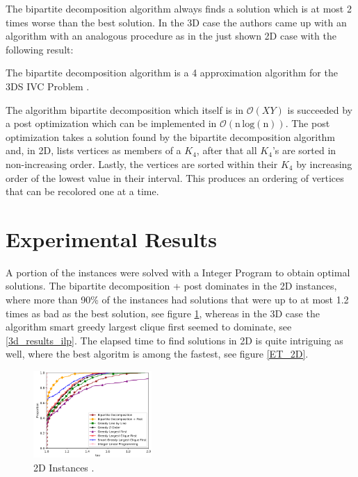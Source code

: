 \documentclass[sigconf]{acmart}
\begin{document}
  The bipartite decomposition algorithm always finds a solution which is at most 2 times worse
  than the best solution. In the 3D case the authors came up with an algorithm with an analogous procedure
  as in the just shown 2D case with the following result:
  
  \begin{theorem}
    The bipartite decomposition algorithm is a 4 approximation algorithm for the 3DS IVC Problem \cite{main_paper}.
  \end{theorem}
  
  The algorithm bipartite decomposition which itself is in $\mathcal{O}(XY)$ is succeeded by a post optimization
  which can be implemented in $\mathcal{O}(\mathrm{n \,log(n)})$. The post optimization takes a solution found by the
  bipartite decomposition algorithm and, in 2D, lists vertices as
  members of a $K_4$, after that all $K_4$'s are sorted in non-increasing order. Lastly,
  the vertices are sorted within their $K_4$ by increasing order of the lowest value in 
  their interval. This produces an ordering of vertices that can be recolored one at a time.


\section{Experimental Results}

A portion of the instances were solved with a Integer Program to obtain optimal solutions. The bipartite 
decomposition + post dominates in the 2D instances, where more than 90\% of the instances had solutions
that were up to at most 1.2 times as bad as the best solution, see figure \ref{2d_results_ilp}, whereas in
the 3D case the algorithm smart greedy largest clique first seemed to dominate, see \ref{3d_results_ilp}. The elapsed time to find
solutions in 2D is quite intriguing as well, where the best algoritm is among the fastest, see figure \ref{ET_2D}.


\begin{figure}[h]
  \centering
  \includegraphics[width=0.4\textwidth]{figures/2d_results_ilp.png}
  \caption{2D Instances \cite{main_paper}.}
  \label{2d_results_ilp}
\end{figure}
\end{document}
